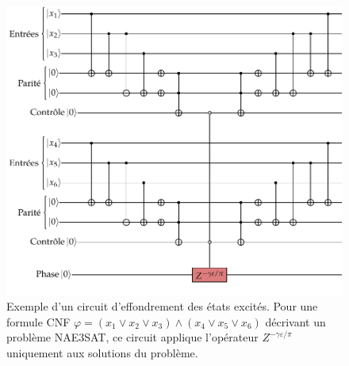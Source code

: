 \begin{figure}[h]
    \centering
    \includegraphics[width=1\textwidth]{figures/tower-excited-states-circuit.pdf}
    \caption[Circuit d'effondrement des états excités]{Exemple d'un circuit d'effondrement des états excités. Pour une formule CNF $\varphi = (x_{1} \lor x_{2} \lor x_{3}) \land (x_{4} \lor x_{5} \lor x_{6})$ décrivant un problème NAE3SAT, ce circuit applique l'opérateur $Z^{-\gamma \varepsilon / \pi}$ uniquement aux solutions du problème.}
    \label{fig:tower-excited-states-circuit}
\end{figure}

